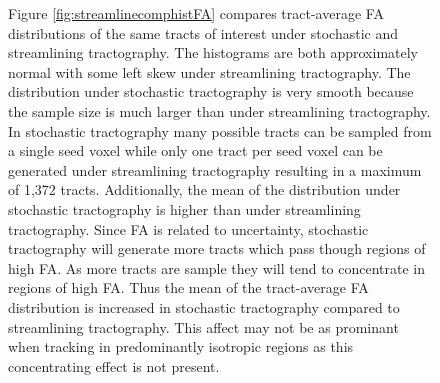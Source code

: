 \begin{figure}
Figure \ref{fig:streamlinecomphistFA} compares tract-average FA distributions of the same tracts of interest under stochastic and streamlining tractography.  The histograms are both approximately normal with some left skew under streamlining tractography.  The distribution under stochastic tractography is very smooth because the sample size is much larger than under streamlining tractography.   In stochastic tractography many possible tracts can be sampled from a single seed voxel while only one tract per seed voxel can be generated under streamlining tractography resulting in a maximum of 1,372 tracts.  Additionally, the mean of the distribution under stochastic tractography is higher than under streamlining tractography.  Since FA is related to uncertainty, stochastic tractography will generate more tracts which pass though regions of high FA.  As more tracts are sample they will tend to concentrate in regions of high FA.  Thus the mean of the tract-average FA distribution is increased in stochastic tractography compared to streamlining tractography.  This affect may not be as prominant when tracking in predominantly isotropic regions as this concentrating effect is not present.


\end{figure}
